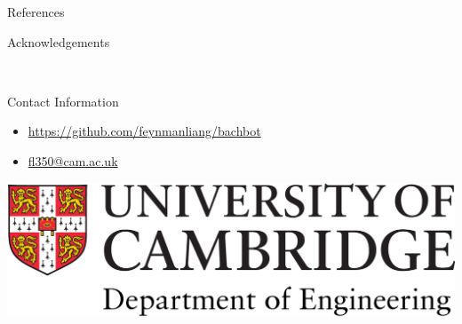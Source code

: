 \documentclass[final]{beamer}
\newlength{\onecolwid}
\begin{document}
\begin{frame}[t]
\begin{columns}[t]
\begin{column}{\onecolwid}

\begin{block}{References}

\nocite{*} %
\small{
}

\end{block}



\begin{block}{Acknowledgements}

\small{} \\

\end{block}



\begin{alertblock}{Contact Information}

\begin{itemize}
\item \href{https://github.com/feynmanliang/bachbot}{https://github.com/feynmanliang/bachbot}
\item \href{mailto:fl350@cam.ac.uk}{fl350@cam.ac.uk}
\end{itemize}

\end{alertblock}

\begin{center}
  \includegraphics[width=0.5\linewidth]{Figures/Engineering.png}
\end{center}


\end{column}
\end{columns}
\end{frame}
\end{document}
